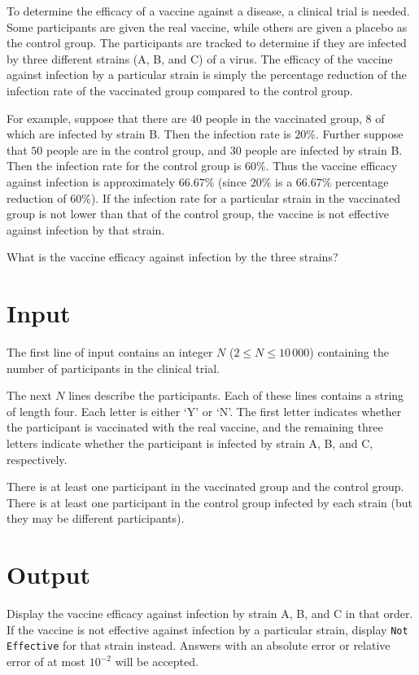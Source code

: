 
To determine the efficacy of a vaccine against a disease, a clinical
trial is needed.  Some participants are given the real vaccine, while
others are given a placebo as the control group.  The participants are
tracked to determine if they are infected by three different strains
(A, B, and C) of a virus.  The efficacy of the vaccine against
infection by a particular strain is simply the percentage reduction of
the infection rate of the vaccinated group compared to the control group.

For example, suppose that there are $40$ people in the vaccinated
group, $8$ of which are infected by strain B.  Then the infection rate
is $20$\%.  Further suppose that $50$ people are in the control group,
and $30$ people are infected by strain B.  Then the infection rate for
the control group is $60$\%.  Thus the vaccine efficacy against
infection is approximately $66.67$\% (since $20$\% is a $66.67$\%
percentage reduction of $60$\%).  If the infection rate for a
particular strain in the vaccinated group is not lower than that of
the control group, the vaccine is not effective against infection by
that strain.

What is the vaccine efficacy against infection by the three strains?

\section*{Input}

The first line of input contains an integer $N$
($2 \leq N \leq 10\,000$) containing the number of participants in the
clinical trial.

The next $N$ lines describe the participants. Each of these lines contains
a string of length four. Each letter is either `Y' or `N'.  The first letter
indicates whether the participant is vaccinated with the real vaccine,
and the remaining three letters indicate whether the participant is
infected by strain A, B, and C, respectively.

There is at least one participant in the vaccinated group and the
control group.  There is at least one participant in the control group
infected by each strain (but they may be different participants).

\section*{Output}

Display the vaccine efficacy against infection by strain A, B, and C
in that order.  If the vaccine is not effective against infection by a
particular strain, display \texttt{Not Effective} for that strain
instead.  Answers with an absolute error or relative error of at most
$10^{-2}$ will be accepted.

